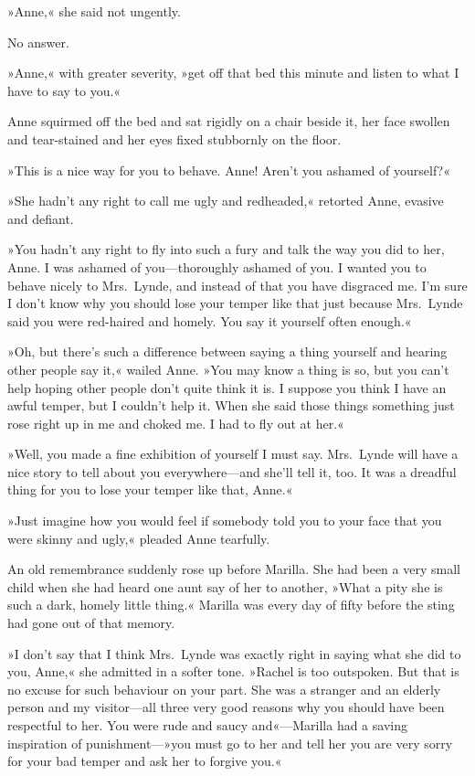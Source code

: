 »Anne,« she said not ungently.

No answer.

»Anne,« with greater severity, »get off that bed this minute and listen to what I have to say to you.«

Anne squirmed off the bed and sat rigidly on a chair beside it, her face swollen and tear-stained and her eyes fixed stubbornly on the floor.

»This is a nice way for you to behave. Anne! Aren't you ashamed of yourself?«

»She hadn't any right to call me ugly and redheaded,« retorted Anne, evasive and defiant.

»You hadn't any right to fly into such a fury and talk the way you did to her, Anne. I was ashamed of you—thoroughly ashamed of you. I wanted you to behave nicely to Mrs.~Lynde, and instead of that you have disgraced me. I'm sure I don't know why you should lose your temper like that just because Mrs.~Lynde said you were red-haired and homely. You say it yourself often enough.«

»Oh, but there's such a difference between saying a thing yourself and hearing other people say it,« wailed Anne. »You may know a thing is so, but you can't help hoping other people don't quite think it is. I suppose you think I have an awful temper, but I couldn't help it. When she said those things something just rose right up in me and choked me. I had to fly out at her.«

»Well, you made a fine exhibition of yourself I must say. Mrs.~Lynde will have a nice story to tell about you everywhere—and she'll tell it, too. It was a dreadful thing for you to lose your temper like that, Anne.«

»Just imagine how you would feel if somebody told you to your face that you were skinny and ugly,« pleaded Anne tearfully.

An old remembrance suddenly rose up before Marilla. She had been a very small child when she had heard one aunt say of her to another, »What a pity she is such a dark, homely little thing.« Marilla was every day of fifty before the sting had gone out of that memory.

»I don't say that I think Mrs.~Lynde was exactly right in saying what she did to you, Anne,« she admitted in a softer tone. »Rachel is too outspoken. But that is no excuse for such behaviour on your part. She was a stranger and an elderly person and my visitor—all three very good reasons why you should have been respectful to her. You were rude and saucy and«—Marilla had a saving inspiration of punishment—»you must go to her and tell her you are very sorry for your bad temper and ask her to forgive you.«


